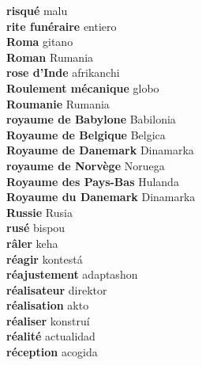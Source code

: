 \textbf{ risqué  } malu \\
\textbf{ rite funéraire  } entiero \\
\textbf{ Roma  } gitano \\
\textbf{ Roman  } Rumania \\
\textbf{ rose d’Inde  } afrikanchi \\
\textbf{ Roulement mécanique  } globo \\
\textbf{ Roumanie  } Rumania \\
\textbf{ royaume de Babylone  } Babilonia \\
\textbf{ Royaume de Belgique  } Belgica \\
\textbf{ Royaume de Danemark  } Dinamarka \\
\textbf{ royaume de Norvège  } Noruega \\
\textbf{ Royaume des Pays-Bas  } Hulanda \\
\textbf{ Royaume du Danemark  } Dinamarka \\
\textbf{ Russie  } Rusia \\
\textbf{ rusé  } bispou \\
\textbf{ râler  } keha \\
\textbf{ réagir  } kontestá \\
\textbf{ réajustement  } adaptashon \\
\textbf{ réalisateur  } direktor \\
\textbf{ réalisation  } akto \\
\textbf{ réaliser  } konstruí \\
\textbf{ réalité  } actualidad \\
\textbf{ réception  } acogida \\
